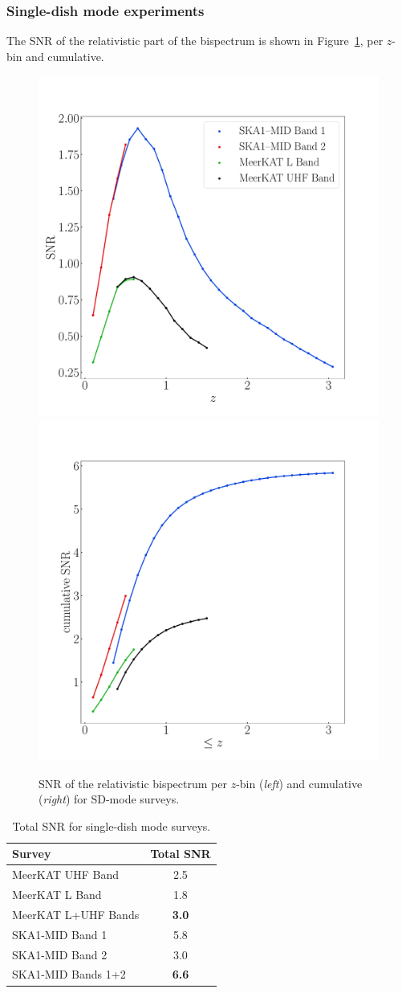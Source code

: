 \subsubsection{Single-dish mode experiments}
%
%
The SNR of the relativistic part of the bispectrum is shown in Figure~\ref{fig3}, per $z$-bin and cumulative.
\begin{figure}[ht]
\centering
\includegraphics[width=.49\textwidth]{fig/snrSingleDishDopplerBg}
\includegraphics[width=.49\textwidth]{fig/snrSingleDishCumDopplerBg} 
\caption{SNR of the relativistic bispectrum per $z$-bin (\emph{left}) and cumulative (\emph{right}) for  SD-mode surveys. }
\label{fig3}
\end{figure}
\begin{table}[ht]
\centering
\caption{\label{tab3} Total SNR for single-dish mode surveys.} 
\vspace*{0.2cm}
\begin{tabular}{|lc|} \hline
Survey & Total SNR \\ \hline\hline 
MeerKAT UHF Band & 2.5 \\
MeerKAT L  Band & 1.8 \\
\hline
MeerKAT L+UHF Bands & {\bfseries 3.0}  \\
\hline
SKA1-MID Band 1 & 5.8 \\
SKA1-MID Band 2 & 3.0 \\
\hline
SKA1-MID Bands 1+2 & {\bfseries 6.6} \\
\hline
\end{tabular}
\end{table} 

